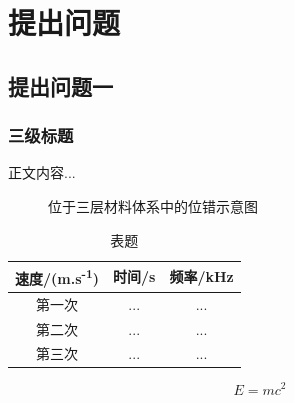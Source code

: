 \section{提出问题}
\subsection{提出问题一}
\subsubsection{三级标题}
正文内容...\cite{ref1}\cite{ref2}

\begin{figure}[htbp]
    \centering
    \caption{位于三层材料体系中的位错示意图}
    \label{fig:dislocation}
\end{figure}

\begin{table}[htbp]
    \centering
    \caption{表题}
    \label{tab:example}
    \begin{tabular}{ccc}
        \toprule
        速度/(m.s\textsuperscript{-1}) & 时间/s & 频率/kHz \\
        \midrule
        第一次 & ... & ... \\
        第二次 & ... & ... \\
        第三次 & ... & ... \\
        \bottomrule
    \end{tabular}
\end{table}

\begin{equation}
    E = mc^2
    \label{eq:example}
\end{equation}

